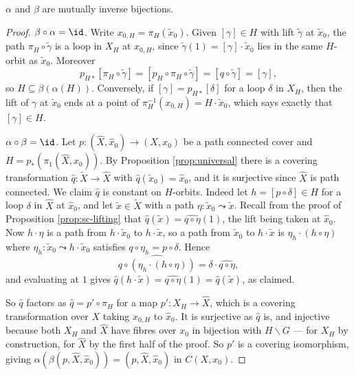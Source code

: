 \begin{theorem} \label{at-thm:galois}
	$\alpha$ and $\beta$ are mutually inverse bijections.
\end{theorem}
\begin{proof}
	\emph{$\beta \circ \alpha = \id$.} Write $x_{0,H} = \pi_H(\tilde x_0)$. Given $[\gamma] \in H$ with lift $\tilde\gamma$ at $\tilde x_0$, the path $\pi_H \circ \tilde\gamma$ is a loop in $X_H$ at $x_{0,H}$, since $\tilde\gamma(1) = [\gamma]\cdot\tilde x_0$ lies in the same $H$-orbit as $\tilde x_0$. Moreover
	$$
	p_{H*}[\pi_H \circ \tilde\gamma] = [p_H \circ \pi_H \circ \tilde\gamma] = [q \circ \tilde\gamma] = [\gamma],
	$$
	so $H \subseteq \beta(\alpha(H))$. Conversely, if $[\gamma] = p_{H*}[\delta]$ for a loop $\delta$ in $X_H$, then the lift of $\gamma$ at $\tilde x_0$ ends at a point of $\pi_H^{-1}(x_{0,H}) = H\cdot\tilde x_0$, which says exactly that $[\gamma] \in H$.

	\emph{$\alpha \circ \beta = \id$.} Let $p: (\hat X, \hat x_0) \to (X, x_0)$ be a path connected cover and $H = p_*(\pi_1(\hat X, \hat x_0))$. By Proposition \ref{prop:universal} there is a covering transformation $\hat q: \widetilde X \to \hat X$ with $\hat q(\tilde x_0) = \hat x_0$, and it is surjective since $\hat X$ is path connected. We claim $\hat q$ is constant on $H$-orbits. Indeed let $h = [p\circ\delta] \in H$ for a loop $\delta$ in $\hat X$ at $\hat x_0$, and let $\tilde x \in \widetilde X$ with a path $\eta: \tilde x_0 \leadsto \tilde x$. Recall from the proof of Proposition \ref{prop:sc-lifting} that $\hat q(\tilde x) = \widehat{q\circ\eta}(1)$, the lift being taken at $\hat x_0$. Now $h \cdot \eta$ is a path from $h\cdot\tilde x_0$ to $h \cdot \tilde x$, so a path from $\tilde x_0$ to $h\cdot\tilde x$ is $\eta_h \cdot (h\circ\eta)$ where $\eta_h: \tilde x_0 \leadsto h \cdot \tilde x_0$ satisfies $q \circ \eta_h = p \circ \delta$. Hence
	$$
	\widehat{q \circ (\eta_h \cdot (h\circ \eta))} = \delta \cdot \widehat{q \circ \eta},
	$$
	and evaluating at $1$ gives $\hat q(h\cdot\tilde x) = \widehat{q\circ\eta}(1) = \hat q(\tilde x)$, as claimed.

	So $\hat q$ factors as $\hat q = p' \circ \pi_H$ for a map $p': X_H \to \hat X$, which is a covering transformation over $X$ taking $x_{0,H}$ to $\hat x_0$. It is surjective as $\hat q$ is, and injective because both $X_H$ and $\hat X$ have fibres over $x_0$ in bijection with $H\backslash G$ --- for $X_H$ by construction, for $\hat X$ by the first half of the proof. So $p'$ is a covering isomorphism, giving $\alpha(\beta(p,\hat X, \hat x_0)) = (p, \hat X, \hat x_0)$ in $C(X, x_0)$.
\end{proof}


